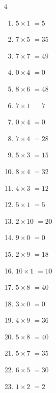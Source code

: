 \begin{multicols}{4}
\begin{enumerate}
  \item $5\times 1$
        $=5$

  \item $7\times 5$
        $=35$

\columnbreak %

  \item $7\times 7$
        $=49$

  \item $0\times 4$
        $=0$

  \item $8\times 6$
        $=48$

  \item $7\times 1$
        $=7$

  \item $0\times 4$
        $=0$

  \item $7\times 4$
        $=28$

  \item $5\times 3$
        $=15$

  \item $8\times 4$
        $=32$

  \item $4\times 3$
        $=12$

  \item $5\times 1$
        $=5$

  \item $2\times 10$
        $=20$

  \item $9\times 0$
        $=0$

  \item $2\times 9$
        $=18$

  \item $10\times 1$
        $=10$

  \item $5\times 8$
        $=40$

  \item $3\times 0$
        $=0$

  \item $4\times 9$
        $=36$

  \item $5\times 8$
        $=40$

  \item $5\times 7$
        $=35$

  \item $6\times 5$
        $=30$

  \item $1\times 2$
        $=2$


\end{enumerate}
\end{multicols}

